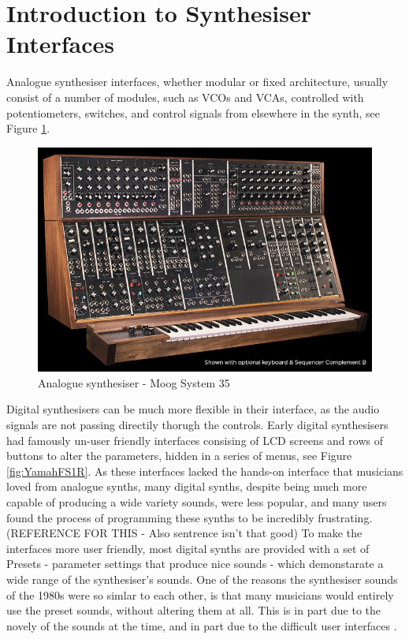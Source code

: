 \documentclass[11pt, oneside]{report}   	%
\begin{document}
\section{Introduction to Synthesiser Interfaces}
Analogue synthesiser interfaces, whether modular or fixed architecture, usually consist of a number of modules, such as VCOs and VCAs, controlled with potentiometers, switches, and control signals from elsewhere in the synth, see Figure \ref{fig:MoogSystem35}. \\
%
\begin{figure}[h] 
	\centering
	\includegraphics[width = 6in]{MoogSystem35.jpg}
	\caption{Analogue synthesiser - Moog System 35 \cite{Moog35}}
	\label{fig:MoogSystem35}
\end{figure}
%
Digital synthesisers can be much more flexible in their interface, as the audio signals are not passing directily thorugh the controls. Early digital synthesisers had famously un-user friendly interfaces consising of LCD screens and rows of buttons to alter the parameters, hidden in a series of menus, see Figure \ref{fig:YamahFS1R}. As these interfaces lacked the hands-on interface that musicians loved from analogue synths, many digital synths, despite being much more capable of producing a wide variety sounds, were less popular, and many users found the process of programming these synths to be incredibly frustrating. (REFERENCE FOR THIS - Also sentrence isn't that good) To make the interfaces more user friendly, most digital synths are provided with a set of Presets - parameter settings that produce nice sounds - which demonstarate a wide range of the synthesiser's sounds. One of the reasons the synthesiser sounds of the 1980s were so simlar to each other, is that many musicians would entirely use the preset sounds, without altering them at all. This is in part due to the novely of the sounds at the time, and in part due to the difficult user interfaces \cite{Synth}.\\
\end{document}
